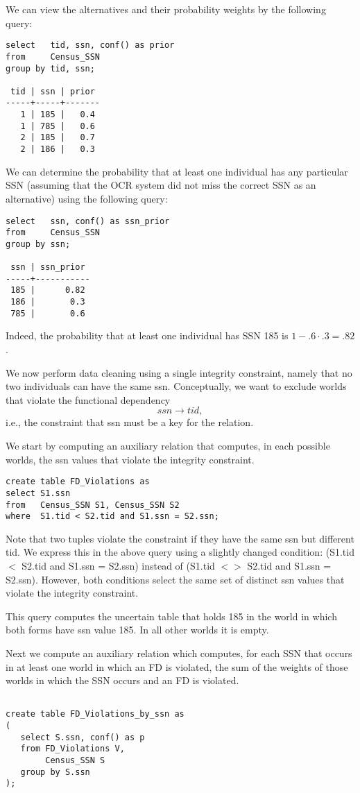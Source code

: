 We can view the alternatives and their probability weights by the following
query:
\begin{verbatim}
select   tid, ssn, conf() as prior
from     Census_SSN
group by tid, ssn;

 tid | ssn | prior
-----+-----+-------
   1 | 185 |   0.4
   1 | 785 |   0.6
   2 | 185 |   0.7
   2 | 186 |   0.3
\end{verbatim}

We can determine the probability that at least one individual has any
particular SSN (assuming that the OCR system did not miss the correct
SSN as an alternative) using the following query:
\begin{verbatim}
select   ssn, conf() as ssn_prior
from     Census_SSN
group by ssn;

 ssn | ssn_prior
-----+-----------
 185 |      0.82
 186 |       0.3
 785 |       0.6
\end{verbatim}
Indeed, the probability that at least one individual has SSN 185 is
$1 - .6 \cdot .3 = .82$.

We now perform data cleaning using a single integrity constraint, namely
that no two individuals can have the same ssn.
Conceptually, we want to exclude worlds that violate the functional dependency
\[
ssn \rightarrow tid,
\]
i.e., the constraint that ssn must be a key for the relation.

We start by computing an auxiliary relation that
computes, in each possible worlds, the ssn values that violate the
integrity constraint.
\begin{verbatim}
create table FD_Violations as
select S1.ssn
from   Census_SSN S1, Census_SSN S2
where  S1.tid < S2.tid and S1.ssn = S2.ssn;
\end{verbatim}
Note that two tuples violate the constraint if they have the same ssn
but different tid. We express this in the above query using a slightly
changed condition: (S1.tid $<$ S2.tid and S1.ssn = S2.ssn) instead of
(S1.tid $<>$ S2.tid and S1.ssn = S2.ssn). However, both conditions
select the same set of distinct ssn values that violate the integrity
constraint.

This query computes the uncertain table that holds 185 in the world in
which both forms have ssn value 185. In all other worlds it is empty.

Next we compute an auxiliary relation which computes, for each
SSN that occurs in at least one world in which an FD is violated,
the sum of the weights of those worlds in
which the SSN occurs and an FD is violated.
\begin{verbatim}

create table FD_Violations_by_ssn as
(
   select S.ssn, conf() as p
   from FD_Violations V,
        Census_SSN S
   group by S.ssn
);
\end{verbatim}

